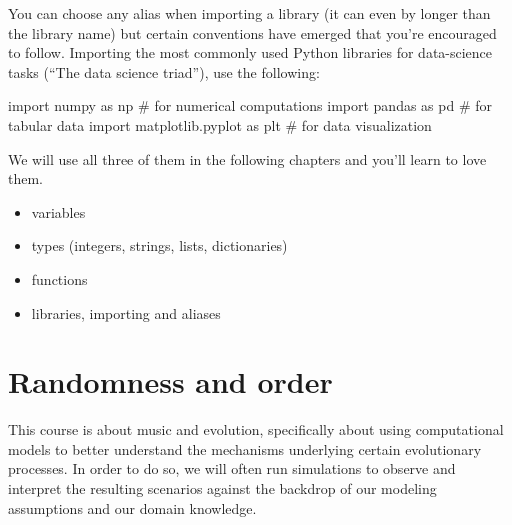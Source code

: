 \documentclass[
  a4paperpaper,
  ,captions=tableheading
]{scrbook}
\newenvironment{Shaded}{\begin{snugshade}}{\end{snugshade}}
\newcommand{\CommentTok}[1]{\textcolor[rgb]{0.37,0.37,0.37}{#1}}
\newcommand{\ImportTok}[1]{\textcolor[rgb]{0.00,0.46,0.62}{#1}}
\newcommand{\NormalTok}[1]{\textcolor[rgb]{0.00,0.23,0.31}{#1}}
\providecommand{\tightlist}{%
  \setlength{\itemsep}{0pt}\setlength{\parskip}{0pt}}
\begin{document}
You can choose any alias when importing a library (it can even by longer
than the library name) but certain conventions have emerged that you're
encouraged to follow. Importing the most commonly used Python libraries
for data-science tasks (``The data science triad''), use the following:

\begin{Shaded}
\begin{Highlighting}[]
\ImportTok{import}\NormalTok{ numpy }\ImportTok{as}\NormalTok{ np }\CommentTok{\# for numerical computations}
\ImportTok{import}\NormalTok{ pandas }\ImportTok{as}\NormalTok{ pd }\CommentTok{\# for tabular data }
\ImportTok{import}\NormalTok{ matplotlib.pyplot }\ImportTok{as}\NormalTok{ plt }\CommentTok{\# for data visualization}
\end{Highlighting}
\end{Shaded}

We will use all three of them in the following chapters and you'll learn
to love them.

\begin{tcolorbox}[enhanced jigsaw, arc=.35mm, colbacktitle=quarto-callout-tip-color!10!white, colback=white, breakable, toprule=.15mm, title=\textcolor{quarto-callout-tip-color}{\faLightbulb}\hspace{0.5em}{Concepts covered}, left=2mm, bottomtitle=1mm, toptitle=1mm, leftrule=.75mm, opacitybacktitle=0.6, titlerule=0mm, opacityback=0, rightrule=.15mm, bottomrule=.15mm, coltitle=black, colframe=quarto-callout-tip-color-frame]

\begin{itemize}
\tightlist
\item
  variables
\item
  types (integers, strings, lists, dictionaries)
\item
  functions
\item
  libraries, importing and aliases
\end{itemize}

\end{tcolorbox}

\hypertarget{sec-randomness}{%
\chapter{Randomness and order}\label{sec-randomness}}

This course is about music and evolution, specifically about using
computational models to better understand the mechanisms underlying
certain evolutionary processes. In order to do so, we will often run
simulations to observe and interpret the resulting scenarios against the
backdrop of our modeling assumptions and our domain knowledge.
\end{document}
